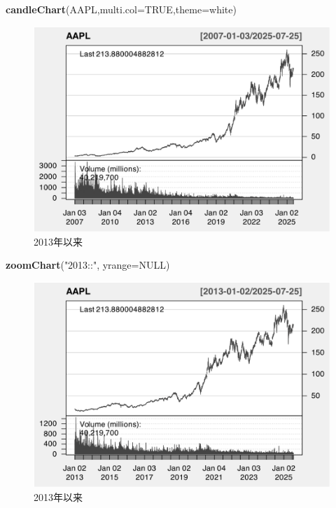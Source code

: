\documentclass[]{ctexbook}
\newenvironment{Shaded}{\begin{snugshade}}{\end{snugshade}}
\newcommand{\AttributeTok}[1]{\textcolor[rgb]{0.13,0.29,0.53}{#1}}
\newcommand{\ConstantTok}[1]{\textcolor[rgb]{0.56,0.35,0.01}{#1}}
\newcommand{\FunctionTok}[1]{\textcolor[rgb]{0.13,0.29,0.53}{\textbf{#1}}}
\newcommand{\NormalTok}[1]{#1}
\newcommand{\StringTok}[1]{\textcolor[rgb]{0.31,0.60,0.02}{#1}}
\begin{document}
\begin{Shaded}
\begin{Highlighting}[]
\FunctionTok{candleChart}\NormalTok{(AAPL,}\AttributeTok{multi.col=}\ConstantTok{TRUE}\NormalTok{,}\AttributeTok{theme=}\StringTok{\textquotesingle{}white\textquotesingle{}}\NormalTok{) }
\end{Highlighting}
\end{Shaded}

\begin{figure}
\includegraphics[width=0.9\linewidth]{QuantmodHandbook_files/figure-latex/zoomYear-1} \caption{2013年以来}\label{fig:zoomYear-1}
\end{figure}

\begin{Shaded}
\begin{Highlighting}[]
\FunctionTok{zoomChart}\NormalTok{(}\StringTok{"2013::"}\NormalTok{, }\AttributeTok{yrange=}\ConstantTok{NULL}\NormalTok{)}
\end{Highlighting}
\end{Shaded}

\begin{figure}
\includegraphics[width=0.9\linewidth]{QuantmodHandbook_files/figure-latex/zoomYear-2} \caption{2013年以来}\label{fig:zoomYear-2}
\end{figure}
\end{document}
